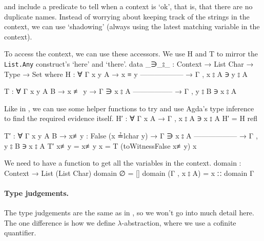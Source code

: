 \documentclass[logo,bsc,singlespacing,parskip,online]{infthesis}
\renewenvironment{code}{\mintedcopy[breaklines,breaksymbolleft=\;]{agda}}{\endmintedcopy}
\begin{document}
\citet{aydemir_engineering_2008} and \citet{chargueraud_locally_2012} include a predicate to tell
when a context is `ok', that is, that there are no duplicate names. Instead of worrying about
keeping track of the strings in the context, we can use `shadowing' (always using the latest
matching variable in the context).

To access the context, we can use these accessors. We use H and T to mirror the \texttt{List.Any}
construct's `here' and `there'.
\begin{code}
data _∋_⦂_ : Context → List Char → Type → Set where
  H : ∀ {Γ x y A}
    → x ≡ y
      ------------------
    → Γ , x ⦂ A ∋ y ⦂ A

  T : ∀ {Γ x y A B}
    → x ≢ y
    → Γ ∋ x ⦂ A
      -----------------
    → Γ , y ⦂ B ∋ x ⦂ A
\end{code}

Like in \citet{wadler_programming_2022}, we can use some helper functions to try and use Agda's type
inference to find the required evidence itself.
\begin{code}
H′ : ∀ {Γ x A}
  → Γ , x ⦂ A ∋ x ⦂ A
H′ = H refl

T′ : ∀ {Γ x y A B}
   → {x≢y : False (x ≟lchar y)}
   → Γ ∋ x ⦂ A
     ------------------
   → Γ , y ⦂ B ∋ x ⦂ A
T′ {x≢y = x≢y} x = T (toWitnessFalse x≢y) x
\end{code}

We need to have a function to get all the variables in the context.
\begin{code}
domain : Context → List (List Char)
domain ∅ = []
domain (Γ , x ⦂ A) = x ∷ domain Γ
\end{code}

\paragraph*{Type judgements.} The type judgements are the same as in
\citet[chapter~Lambda]{wadler_programming_2022}, so we won't go into much detail here. The one
difference is how we define $\lambda$-abstraction, where we use a cofinite quantifier.
\end{document}
